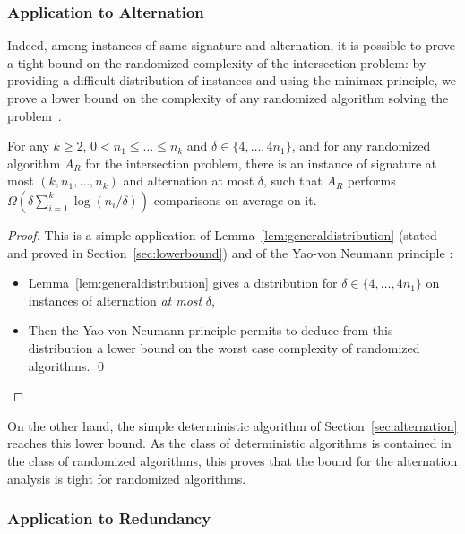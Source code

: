 \subsubsection{Application to Alternation}
\label{sec:appl-altern}


Indeed, among instances of same signature and alternation, it is
possible to prove a tight bound on the randomized complexity of the
intersection problem: by providing a difficult distribution of
instances and using the minimax principle, we prove a lower bound on
the complexity of any randomized algorithm solving the
problem~\cite{adaptiveIntersectionAndTThresholdProblems}.
%
\begin{theorem}\label{th:alternationLB}
For any $k{\geq} 2$, $0{<}n_1{\leq}\ldots{\leq}n_k$ and
$\delta{\in}\{4,\ldots,4n_1\}$,
%
and for any randomized algorithm $A_R$ for the intersection problem,
%
there is an instance of signature at most $(k,n_1,\ldots,n_k)$ and
alternation at most $\delta$,
%
such that $A_R$ performs $\Omega(\delta\sum_{i=1}^k\log(n_i/\delta))$
comparisons on average on it.
\end{theorem}
\begin{proof}
This is a simple application of Lemma~\ref{lem:generaldistribution}
(stated and proved in Section~\ref{sec:lowerbound})
and of the Yao-von Neumann principle \cite{vonneumann1944,sion58,yao}:
\begin{itemize}
\item Lemma~\ref{lem:generaldistribution} gives a distribution for
$\delta\in\{4,\ldots,4n_1\}$ on instances of
alternation {\em at most} $\delta$,
\item Then the Yao-von Neumann principle permits to deduce from this
distribution a lower bound on the worst case complexity of randomized
algorithms.  \qed\end{itemize}
\end{proof}

On the other hand, the simple deterministic algorithm of
Section~\ref{sec:alternation} reaches this lower bound.
%
As the class of deterministic algorithms is contained in the class of
randomized algorithms, this proves that the bound for the alternation
analysis is tight for randomized algorithms.
%



\subsubsection{Application to Redundancy}
\label{sec:appl-redund}





